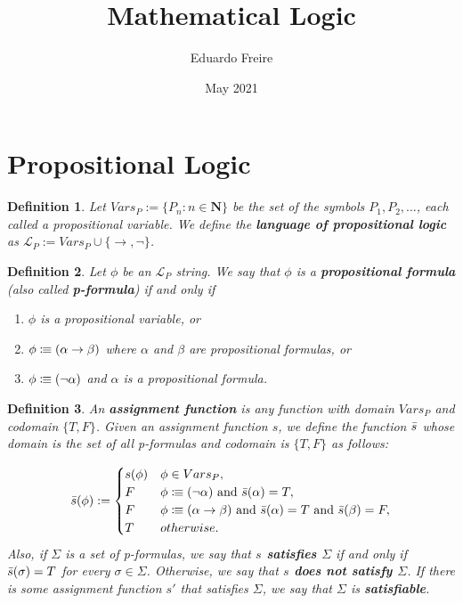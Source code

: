 \documentclass[leqno]{article}
\title{Mathematical Logic}
\author{Eduardo Freire}
\date{May 2021}
\newtheorem{definition}{Definition}[section]
\newcommand{\N}{\mathbf{N}}
\newcommand{\set}[1]{\{#1\}}
\newcommand{\lang}{\mathcal{L}}
\newcommand{\is}{\colonequiv}
\newcommand{\limplies}{\rightarrow}
\begin{document}
\maketitle
\section{Propositional Logic}
\begin{definition}
    Let $Vars_P := \set{P_n: n \in \N}$  be the set of the symbols $P_1, P_2, \dots $, each called a propositional variable. We define the \textbf{language of propositional logic} as $\lang_P := Vars_P \cup \set{\limplies, \neg}$.
\end{definition}

\begin{definition}
    Let $\phi$ be an $\lang_P$ string. We say that $\phi$ is a \textbf{propositional formula} (also called \textbf{p-formula}) if and only if
    
    \begin{enumerate}
        \item $\phi$ is a propositional variable, or
        \item $\phi \is (\alpha \limplies \beta)$ where $\alpha$ and $\beta$ are propositional formulas, or
        \item $\phi \is (\neg \alpha)$ and $\alpha$ is a propositional formula.
    \end{enumerate}
\end{definition}

\begin{definition}
    An \textbf{assignment function} is any function with domain $Vars_P$ and codomain $\set{T, F}$. Given an assignment function $s$, we define the function $\Bar{s}$ whose domain is the set of all p-formulas and codomain is $\set{T, F}$ as follows:
    
    \begin{equation*}
        \Bar{s}(\phi) := 
        \begin{cases}
        s(\phi) & \phi \in Vars_P, \\
        F & \phi \is (\neg \alpha) \text{ and } \Bar{s}(\alpha) = T,\\
        F & \phi \is (\alpha \limplies \beta) \text{ and } \Bar{s}(\alpha) = T \text{ and } \Bar{s}(\beta) = F,\\
        T & otherwise.
        \end{cases}
    \end{equation*} Also, if $\Sigma$ is a set of p-formulas, we say that \textbf{$s$ satisfies $\Sigma$} if and only if $\Bar{s}(\sigma) = T$ for every $\sigma \in \Sigma$. Otherwise, we say that \textbf{$s$ does not satisfy $\Sigma$}. If there is some assignment function $s'$ that satisfies $\Sigma$, we say that $\Sigma$ is \textbf{satisfiable}.
\end{definition}
\end{document}
